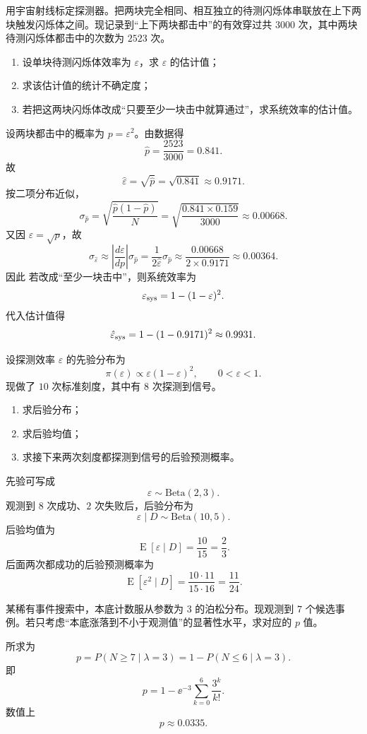 \begin{question}
用宇宙射线标定探测器。把两块完全相同、相互独立的待测闪烁体串联放在上下两块触发闪烁体之间。现记录到“上下两块都击中”的有效穿过共 $3000$ 次，其中两块待测闪烁体都击中的次数为 $2523$ 次。
\begin{enumerate}
\item 设单块待测闪烁体效率为 $\varepsilon$，求 $\varepsilon$ 的估计值；
\item 求该估计值的统计不确定度；
\item 若把这两块闪烁体改成“只要至少一块击中就算通过”，求系统效率的估计值。
\end{enumerate}
\begin{solution}
设两块都击中的概率为 $p=\varepsilon^2$。由数据得
\[
\hat p=\frac{2523}{3000}=0.841.
\]
故
\[
\hat\varepsilon=\sqrt{\hat p}=\sqrt{0.841}\approx 0.9171.
\]
按二项分布近似，
\[
\sigma_{\hat p}=\sqrt{\frac{\hat p(1-\hat p)}{N}}
=\sqrt{\frac{0.841\times 0.159}{3000}}
\approx 0.00668.
\]
又因 $\varepsilon=\sqrt p$，故
\[
\sigma_{\hat\varepsilon}\approx \left|\frac{d\varepsilon}{dp}\right|\sigma_{\hat p}
=\frac{1}{2\hat\varepsilon}\sigma_{\hat p}
\approx \frac{0.00668}{2\times 0.9171}
\approx 0.00364.
\]
因此
若改成“至少一块击中”，则系统效率为
\[
\varepsilon_{\rm sys}=1-(1-\varepsilon)^2.
\]
代入估计值得
\[
\hat\varepsilon_{\rm sys}=1-(1-0.9171)^2\approx 0.9931.
\]
\end{solution}
\end{question}

\begin{question}
设探测效率 $\varepsilon$ 的先验分布为
\[
\pi(\varepsilon)\propto \varepsilon(1-\varepsilon)^2,
\qquad 0<\varepsilon<1.
\]
现做了 $10$ 次标准刻度，其中有 $8$ 次探测到信号。
\begin{enumerate}
\item 求后验分布；
\item 求后验均值；
\item 求接下来两次刻度都探测到信号的后验预测概率。
\end{enumerate}
\begin{solution}
先验可写成
\[
\varepsilon\sim \mathrm{Beta}(2,3).
\]
观测到 $8$ 次成功、$2$ 次失败后，后验分布为
\[
\varepsilon\mid D\sim \mathrm{Beta}(10,5).
\]
后验均值为
\[
\operatorname{E}[\varepsilon\mid D]=\frac{10}{15}=\frac23.
\]
后面两次都成功的后验预测概率为
\[
\operatorname{E}[\varepsilon^2\mid D]
=\frac{10\cdot 11}{15\cdot 16}
=\frac{11}{24}.
\]
\end{solution}
\end{question}

\begin{question}
某稀有事件搜索中，本底计数服从参数为 $3$ 的泊松分布。现观测到 $7$ 个候选事例。若只考虑“本底涨落到不小于观测值”的显著性水平，求对应的 $p$ 值。
\begin{solution}
所求为
\[
p=P(N\ge 7\mid \lambda=3)=1-P(N\le 6\mid \lambda=3).
\]
即
\[
p=1-\ee^{-3}\sum_{k=0}^{6}\frac{3^k}{k!}.
\]
数值上
\[
p\approx 0.0335.
\]
\end{solution}
\end{question}

